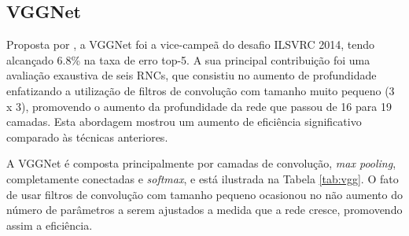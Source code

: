 \subsection{VGGNet}
Proposta por \cite{simonyan2014very}, a VGGNet foi a vice-campeã do desafio ILSVRC 2014, tendo alcançado 6.8\% na taxa de erro top-5. A sua principal contribuição foi uma avaliação exaustiva de seis RNCs, que consistiu no aumento de profundidade enfatizando a utilização de filtros de convolução com tamanho muito pequeno (3 x 3), promovendo o aumento da profundidade da rede que passou de 16 para 19 camadas. Esta abordagem mostrou um aumento de eficiência significativo comparado às técnicas anteriores. 

A VGGNet é composta principalmente por camadas de convolução, \textit{max pooling}, completamente conectadas e \textit{softmax}, e está ilustrada na Tabela \ref{tab:vgg}. O fato de usar filtros de convolução com tamanho pequeno ocasionou no não aumento do número de parâmetros a serem ajustados a medida que a rede cresce, promovendo assim a eficiência.




